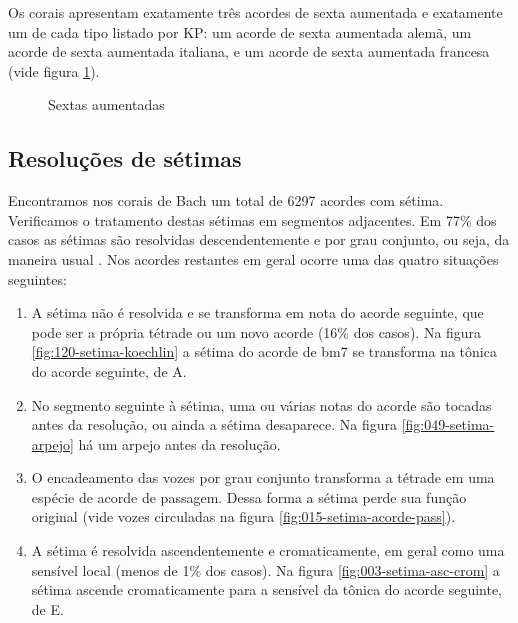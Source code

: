 Os corais apresentam exatamente três acordes de sexta aumentada e
exatamente um de cada tipo listado por KP: um acorde de sexta
aumentada alemã, um acorde de sexta aumentada italiana, e um acorde de
sexta aumentada francesa (vide figura \ref{fig:sextas-aumentadas}).

\begin{figure}
  \centering
  \caption{Sextas aumentadas}
  \label{fig:sextas-aumentadas}
\end{figure}

\subsection{Resoluções de sétimas}
\label{sec:setimas}

Encontramos nos corais de Bach um total de 6297 acordes com sétima.
Verificamos o tratamento destas sétimas em  segmentos adjacentes. Em 77\% dos casos as
sétimas são resolvidas descendentemente e por grau conjunto, ou seja,
da maneira usual \cite[p. 207]{kostka.ea00:tonal}.  Nos acordes
restantes em geral ocorre uma das quatro situações seguintes:

\begin{enumerate}
\item A sétima não é resolvida e se transforma em nota do acorde
  seguinte, que pode ser a própria tétrade ou um novo acorde (16\% dos
  casos). Na figura \ref{fig:120-setima-koechlin} a sétima do acorde
  de bm7 se transforma na tônica do acorde seguinte, de A.
\item No segmento seguinte à sétima, uma ou várias notas do acorde são
  tocadas antes da resolução, ou ainda a sétima desaparece. Na figura
  \ref{fig:049-setima-arpejo} há um arpejo antes da resolução.
\item O encadeamento das vozes por grau conjunto transforma a tétrade
  em uma espécie de acorde de passagem. Dessa forma a sétima perde sua
  função original (vide vozes circuladas na figura
  \ref{fig:015-setima-acorde-pass}).
\item A sétima é resolvida ascendentemente e cromaticamente, em geral
  como uma sensível local (menos de 1\% dos casos). Na figura
  \ref{fig:003-setima-asc-crom} a sétima ascende cromaticamente para a
  sensível da tônica do acorde seguinte, de E.
\end{enumerate}

